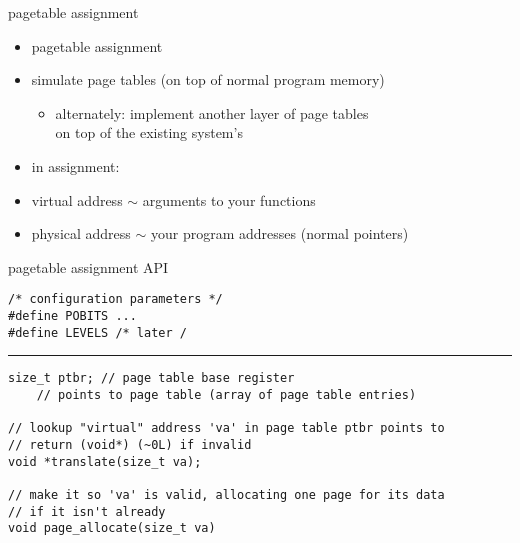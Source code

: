 \usetikzlibrary{matrix}
\begin{frame}{pagetable assignment}
    \begin{itemize}
    \item pagetable assignment
    \item simulate page tables (on top of normal program memory)
        \begin{itemize}
            \item alternately: implement another layer of page tables \\
                on top of the existing system's
        \end{itemize}
    \vspace{.5cm}
    \item in assignment:
    \item virtual address $\sim$ arguments to your functions
    \item physical address $\sim$ your program addresses (normal pointers)
    \end{itemize}
\end{frame}

\begin{frame}[fragile,label=asgnAPI]{pagetable assignment API}
\lstset{language=C,style=smaller}
\begin{lstlisting}
/* configuration parameters */
#define POBITS ...
#define LEVELS /* later /
\end{lstlisting}
\hrule
\begin{lstlisting}
size_t ptbr; // page table base register
    // points to page table (array of page table entries)

// lookup "virtual" address 'va' in page table ptbr points to
// return (void*) (~0L) if invalid
void *translate(size_t va);

// make it so 'va' is valid, allocating one page for its data
// if it isn't already
void page_allocate(size_t va)
\end{lstlisting}
\end{frame}

